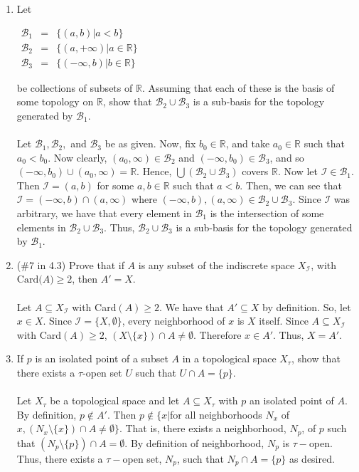 \documentclass[12pt]{article}
\begin{document}
\begin{enumerate}
\item Let 

$\begin{array}{rcl}
\mathcal{B}_1&=&\{(a,b)|a < b\}\\
\mathcal{B}_2&=&\{(a,+\infty)|a\in \mathbb{R}\}\\
\mathcal{B}_3&=&\{(-\infty,b)|b\in\mathbb{R}\}
\end{array}$

be collections of subsets of $\mathbb{R}$. Assuming that each of these is the basis of some topology on $\mathbb{R}$, show that $\mathcal{B}_2\cup \mathcal{B}_3$ is a sub-basis for the topology generated by $\mathcal{B}_1$.\\\\
Let $\mathcal{B}_1, \mathcal{B}_2,$ and $\mathcal{B}_3$ be as given. Now, fix $b_0\in\mathbb{R}$, and take $a_0\in\mathbb{R}$ such that $a_0<b_0$. Now clearly, $(a_0,\infty)\in\mathcal{B}_2$ and $(-\infty,b_0)\in\mathcal{B}_3$, and so $(-\infty,b_0)\cup(a_0,\infty)=\mathbb{R}$. Hence, $\bigcup(\mathcal{B}_2\cup\mathcal{B}_3)$ covers $\mathbb{R}$. Now let $\mathcal{I}\in\mathcal{B}_1$. Then $\mathcal{I}=(a,b)$ for some $a,b\in\mathbb{R}$ such that $a<b$. Then, we can see that $\mathcal{I}=(-\infty, b)\cap(a,\infty)$ where $(-\infty, b),(a,\infty)\in\mathcal{B}_2\cup \mathcal{B}_3$. Since $\mathcal{I}$ was arbitrary, we have that every element in $\mathcal{B}_1$ is the intersection of some elements in $\mathcal{B}_2\cup \mathcal{B}_3$. Thus, $\mathcal{B}_2\cup \mathcal{B}_3$ is a sub-basis for the topology generated by $\mathcal{B}_1$.

\item (\#7 in 4.3) Prove that if $A$ is any subset of the indiscrete space $X_{\mathcal{I}}$, with $\text{Card($A$)}\geq 2$, then $A' = X$.\\\\
Let $A\subseteq X_{\mathcal{I}}$ with Card$(A)\geq2$. We have that $A'\subseteq X$ by definition. So, let $x\in X$. Since $\mathcal{I}=\{X,\emptyset\}$, every neighborhood of $x$ is $X$ itself. Since $A\subseteq X_{\mathcal{I}}$ with Card$(A)\geq2$, $(X\setminus\{x\})\cap A\neq\emptyset$. Therefore $x\in A'$. Thus, $X=A'$.

\item If $p$ is an isolated point of a subset $A$ in a topological space $X_{\tau}$, show that there exists a $\tau$-open set $U$ such that $U\cap A = \{p\}$.\\\\
Let $X_{\tau}$ be a topological space and let $A\subseteq X_{\tau}$ with $p$ an isolated point of $A$. By definition, $p\notin A'$. Then $p\notin\{x|$for all neighborhoods $N_x$ of $x, (N_x\setminus\{x\})\cap A\neq\emptyset\}$. That is, there exists a neighborhood, $N_p$, of $p$ such that $(N_p\setminus\{p\})\cap A=\emptyset$. By definition of neighborhood, $N_p$ is $\tau-$open. Thus, there exists a $\tau-$open set, $N_p$, such that $N_p\cap A=\{p\}$ as desired.


\end{enumerate}
\end{document}
